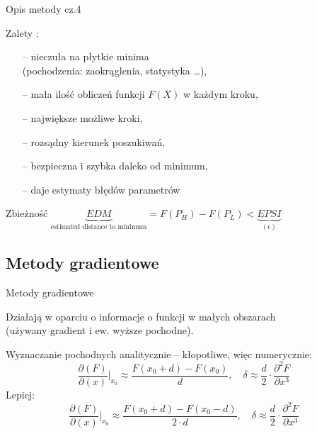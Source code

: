   \begin{frame}{Opis metody cz.4}

	\begin{block}{Zalety :}
	  	\begin{itemize}
	  		\item[--] nieczuła na płytkie minima
	  		\\(pochodzenia: zaokrąglenia, statystyka \ldots),
	  		\item[--] mała ilość obliczeń funkcji $F(X)$ w każdym kroku,
	  		\item[--] największe możliwe kroki,
	  		\item[--] rozsądny kierunek poszukiwań,
	  		\item[--] bezpieczna i szybka daleko od minimum,
	  		\item[--] daje estymaty błędów parametrów
	  	\end{itemize}
    \end{block}
    \begin{block}{Zbieżność}
	  	$\underbrace{EDM}_{ \text{estimated distance to minimum}} = F(P_H) - F(P_L) < \underbrace{EPSI}_{(\epsilon)}$
    \end{block}

  \end{frame}

\subsection{Metody gradientowe}

  \begin{frame}{Metody gradientowe}

 	Działają w oparciu o informacje o funkcji w małych obszarach
 	\\(używany gradient i ew. wyższe pochodne).
    \begin{block}{Wyznaczanie pochodnych}
 	   analitycznie -- kłopotliwe, więc numerycznie:
 	   \begin{displaymath}
 	   	  \frac{\partial (F)}{\partial (x)} \bigg\vert_{x_0} \approx \frac{F(x_0+d) - F(x_0)}{d},
 	   	  \quad \delta \approx \frac{d}{2} \cdot \frac{\partial^2F}{\partial x^3}
 	   \end{displaymath}
 	   Lepiej:
 	   \begin{displaymath}
 	   	  \frac{\partial (F)}{\partial (x)} \bigg\vert_{x_0} \approx \frac{F(x_0+d) - F(x_0-d)}{2\cdot d},
 	   	  \quad \delta \approx \frac{d}{2} \cdot \frac{\partial^2F}{\partial x^3}
 	   \end{displaymath}
  	\end{block}

  \end{frame}

